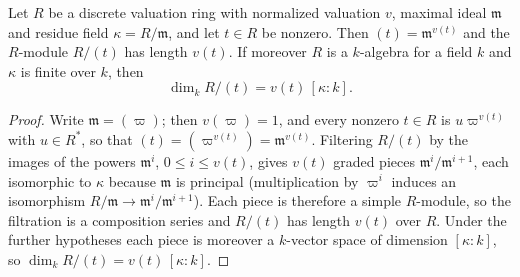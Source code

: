 \begin{lemma}
\label{lem:pcb-dvr-quotient-dimension}
Let \(R\) be a discrete valuation ring with normalized valuation \(v\),
maximal ideal \(\mathfrak m\) and residue field
\(\kappa=R/\mathfrak m\), and let \(t\in R\) be nonzero.  Then
\((t)=\mathfrak m^{v(t)}\) and the \(R\)-module \(R/(t)\) has length
\(v(t)\).  If moreover \(R\) is a \(k\)-algebra for a field \(k\) and
\(\kappa\) is finite over \(k\), then
\[
 \dim_kR/(t)=v(t)\,[\kappa:k].
\]
\end{lemma}
\begin{proof}
Write \(\mathfrak m=(\varpi)\); then \(v(\varpi)=1\), and every nonzero
\(t\in R\) is \(u\varpi^{v(t)}\) with \(u\in R^{*}\), so that
\((t)=(\varpi^{v(t)})=\mathfrak m^{v(t)}\).  Filtering \(R/(t)\) by the
images of the powers \(\mathfrak m^{i}\), \(0\le i\le v(t)\), gives
\(v(t)\) graded pieces \(\mathfrak m^{i}/\mathfrak m^{i+1}\), each
isomorphic to \(\kappa\) because \(\mathfrak m\) is principal
(multiplication by \(\varpi^{i}\) induces an isomorphism
\(R/\mathfrak m\to\mathfrak m^{i}/\mathfrak m^{i+1}\)).  Each piece is
therefore a simple \(R\)-module, so the filtration is a composition
series and \(R/(t)\) has length \(v(t)\) over \(R\).  Under the further
hypotheses each piece is moreover a \(k\)-vector space of dimension
\([\kappa:k]\), so \(\dim_kR/(t)=v(t)\,[\kappa:k]\).
\end{proof}

